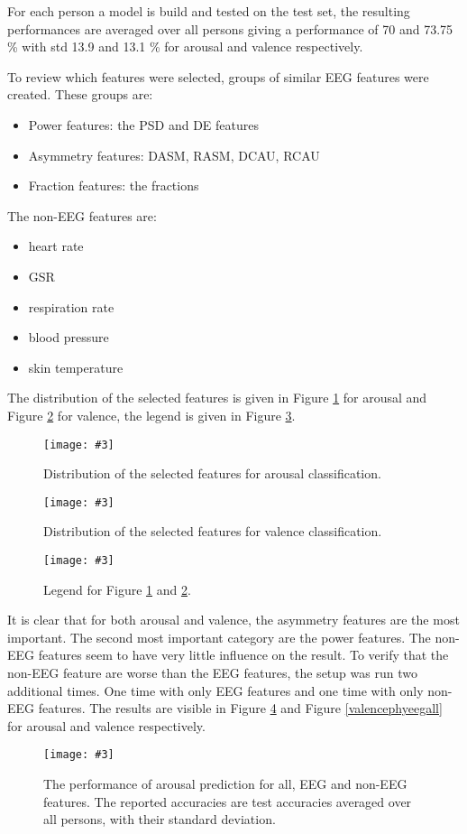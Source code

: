 \documentclass[11pt,journal,compsoc]{IEEEtran}
\newcommand{\npar}{\par \vspace{2.3ex plus 0.3ex minus 0.3ex}}
\newcommand{\mijnfiguur}[4][H]{            %
    \begin{figure}[#1]                      %
        \begin{center}                      %
            \texttt{[image: \#3]}        %
            \caption{#4\label{#3}}          %
        \end{center}
    \end{figure}
    }
\begin{document}
\npar

For each person a model is build and tested on the test set, the resulting performances are averaged over all persons giving a performance of  70 and 73.75 \% with std 13.9 and 13.1 \% for arousal and valence respectively. 

\npar

To review which features were selected, groups of similar EEG features were created. These groups are:
\begin{itemize}
\item Power features: the PSD and DE features
\item Asymmetry features: DASM, RASM, DCAU, RCAU
\item Fraction features: the fractions
\end{itemize}
The non-EEG features are:
\begin{itemize}
\item heart rate
\item GSR
\item respiration rate
\item blood pressure
\item skin temperature
\end{itemize}
The distribution of the selected features is given in Figure \ref{arousalALLRF} for arousal and Figure \ref{valenceALLRF} for valence, the legend is given in Figure \ref{legend}.

\mijnfiguur{width=0.25\textwidth}{arousalALLRF}{Distribution of the selected features for arousal classification.}
\mijnfiguur{width=0.25\textwidth}{valenceALLRF}{Distribution of the selected features for valence classification.}
\mijnfiguur{width=0.25\textwidth}{legend}{Legend for Figure \ref{arousalALLRF} and \ref{valenceALLRF}.}

It is clear that for both arousal and valence, the asymmetry features are the most important. The second most important category are the power features. The non-EEG features seem to have very little influence on the result. To verify that the non-EEG feature are worse than the EEG features, the setup was run two additional times. One time with only EEG features and one time with only non-EEG features. The results are visible in Figure \ref{arousalphyeegall} and Figure \ref{valencephyeegall} for arousal and valence respectively. 

\mijnfiguur{width=.5\textwidth}{arousalphyeegall}{The performance of arousal prediction for all, EEG and non-EEG features. The reported accuracies are test accuracies averaged over all persons, with their standard deviation.}
\end{document}
